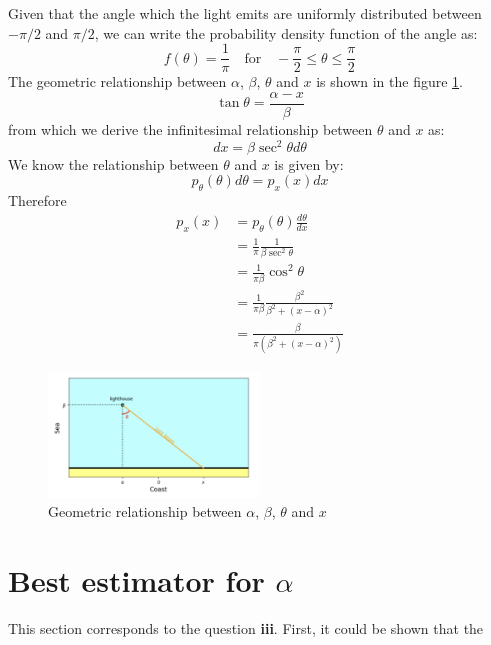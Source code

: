 \documentclass[12pt,a4paper]{article}
\begin{document}
Given that the angle which the light emits are uniformly distributed between $-\pi/2$ and $\pi/2$, we can write the probability density function of the angle as:
\begin{equation}
    f(\theta) = \frac{1}{\pi} \quad \text{for} \quad -\frac{\pi}{2} \leq \theta \leq \frac{\pi}{2}
\end{equation}
The geometric relationship between $\alpha$, $\beta$, $\theta$ and $x$ is shown in the figure \ref{fig:geometry}.
$$
    \tan\theta = \frac{\alpha-x}{\beta}
$$
from which we derive the infinitesimal relationship between $\theta$ and $x$ as:
\begin{equation}
    {dx} = \beta \sec^2\theta d\theta
\end{equation}
We know the relationship between $\theta$ and $x$ is given by:
\begin{equation}
    p_{\theta}(\theta) d\theta = p_{x}(x) dx
\end{equation}
Therefore
\begin{align*}
    p_{x}(x) &= p_{\theta}(\theta) \frac{d\theta}{dx} \\
    &= \frac{1}{\pi} \frac{1}{\beta\sec^2\theta} \\
    &= \frac{1}{\pi\beta} \cos^2\theta\\
    &= \frac{1}{\pi\beta} \frac{\beta^2}{\beta^2 + (x-\alpha)^2}\\
    &= \frac{\beta}{\pi(\beta^2 + (x-\alpha)^2)}
\end{align*}
\begin{figure}[H]
    \centering
    \includegraphics[width=0.5\textwidth]{figures/lighthouse.png}
    \caption{Geometric relationship between $\alpha$, $\beta$, $\theta$ and $x$}
    \label{fig:geometry}
\end{figure}
\section{Best estimator for $\alpha$}
This section corresponds to the question \textbf{iii}.
First, it could be shown that the 
\end{document}
